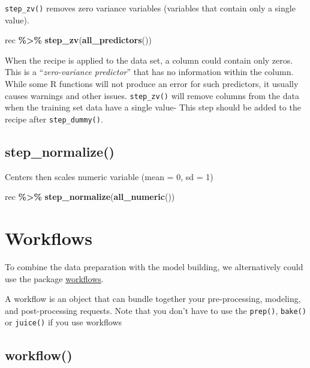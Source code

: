 \documentclass[
]{book}
\newenvironment{Shaded}{\begin{snugshade}}{\end{snugshade}}
\newcommand{\KeywordTok}[1]{\textcolor[rgb]{0.13,0.29,0.53}{\textbf{#1}}}
\newcommand{\NormalTok}[1]{#1}
\newcommand{\OperatorTok}[1]{\textcolor[rgb]{0.81,0.36,0.00}{\textbf{#1}}}
\newcommand{\StringTok}[1]{\textcolor[rgb]{0.31,0.60,0.02}{#1}}
\begin{document}
\texttt{step\_zv()} removes zero variance variables (variables that contain only a single value).

\begin{Shaded}
\begin{Highlighting}[]
\NormalTok{rec }\OperatorTok{\%\textgreater{}\%}
\StringTok{  }\KeywordTok{step\_zv}\NormalTok{(}\KeywordTok{all\_predictors}\NormalTok{())}
\end{Highlighting}
\end{Shaded}

When the recipe is applied to the data set, a column could contain only zeros. This is a ``\emph{zero-variance predictor}'' that has no information within the column. While some R functions will not produce an error for such predictors, it usually causes warnings and other issues. \texttt{step\_zv()} will remove columns from the data when the training set data have a single value- This step should be added to the recipe after \texttt{step\_dummy()}.

\hypertarget{step_normalize}{%
\section{step\_normalize()}\label{step_normalize}}

Centers then scales numeric variable (mean = 0, sd = 1)

\begin{Shaded}
\begin{Highlighting}[]
\NormalTok{rec }\OperatorTok{\%\textgreater{}\%}
\StringTok{  }\KeywordTok{step\_normalize}\NormalTok{(}\KeywordTok{all\_numeric}\NormalTok{())}
\end{Highlighting}
\end{Shaded}

\hypertarget{workflows}{%
\chapter{Workflows}\label{workflows}}

To combine the data preparation with the model building, we alternatively could use the package \href{https://workflows.tidymodels.org}{workflows}.

A workflow is an object that can bundle together your pre-processing, modeling, and post-processing requests. Note that you don't have to use the \texttt{prep()}, \texttt{bake()} or \texttt{juice()} if you use workflows

\hypertarget{workflow}{%
\section{workflow()}\label{workflow}}
\end{document}
